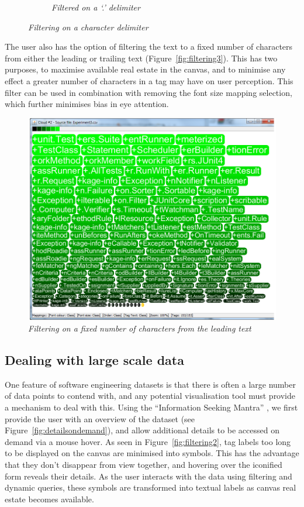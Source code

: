\begin{figure}[!htb]
\begin{subfigure}{\textwidth}
	 \caption{\textit{Filtered on a `.' delimiter}}
\end{subfigure}
  \caption{\textit{Filtering on a character delimiter}}
  \label{fig:filtering2}
\end{figure}

The user also has the option of filtering the text to a fixed number of characters from either the leading or trailing text (Figure~\vref{fig:filtering3}). This has two purposes, to maximise available real estate in the canvas, and to minimise any effect a greater number of characters in a tag may have on user perception. This filter can be used in combination with removing the font size mapping selection, which further minimises bias in eye attention.  

\begin{figure}[!htb]
  	\centering
   	\includegraphics[scale=0.35]{taglabeltrimfilter.png}
  	\caption{\textit{Filtering on a fixed number of characters from the leading text}}
	\label{fig:filtering3}
\end{figure}

\subsection{Dealing with large scale data}

One feature of software engineering datasets is that there is often a large number of data points to contend with, and any potential visualisation tool must provide a mechanism to deal with this. Using the ``Information Seeking Mantra'' \citep{schneiderman96}, we first provide the user with an overview of the dataset (see Figure~\vref{fig:detailsondemand}), and allow additional details to be accessed on demand via a mouse hover. As seen in Figure~\vref{fig:filtering2}, tag labels too long to be displayed on the canvas are minimised into symbols. This has the advantage that they don't disappear from view together, and hovering over the iconified form reveals their details. As the user interacts with the data using filtering and dynamic queries, these symbols are transformed into textual labels as canvas real estate becomes available. 

